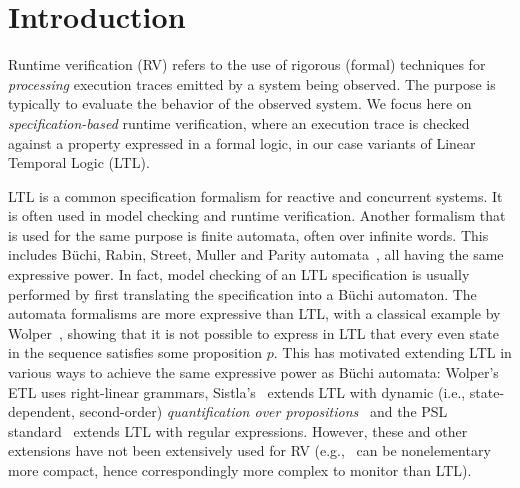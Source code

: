 
\section{Introduction}

Runtime verification (RV)  \cite{bartocci18,havelund-rv-data-2018} 
refers to the use of rigorous (formal) 
techniques for {\em processing} execution traces emitted by a system being observed. 
The purpose is typically to evaluate the behavior of the observed system. We focus here on {\em specification-based} runtime verification, 
where an execution trace is checked against a property expressed in a formal logic, 
in our case variants of Linear Temporal Logic (LTL).

LTL is a common specification formalism for reactive and concurrent systems. It is often used in model checking and runtime verification. Another formalism that is used for the same purpose is finite automata, often over infinite words. This includes B\"{u}chi, Rabin, Street, Muller and Parity automata~\cite{Thomas}, all having the same expressive power. In fact, model checking of an LTL specification
is usually performed by first translating the specification into a B\"{u}chi automaton. The automata formalisms are more expressive than LTL, with a classical example by Wolper~\cite{Wolper}, showing that
it is not possible to express in LTL that every even state in
the sequence satisfies some proposition $p$. 
%
This has motivated extending LTL in various ways to achieve the same expressive power as B\"{u}chi automata:
Wolper's ETL \cite{Wolper,WVS} uses right-linear grammars,
Sistla's~\QLTL{} extends LTL  
with dynamic (i.e., state-dependent, second-order) {\em quantification over propositions}~\cite{sistla-phd-83} and the PSL standard~\cite{psl-standard-2010} extends LTL with regular expressions.
However, these and other extensions have not been extensively used
for RV (e.g., \QLTL\  can be nonelementary more compact, hence
correspondingly more complex to monitor than LTL).


